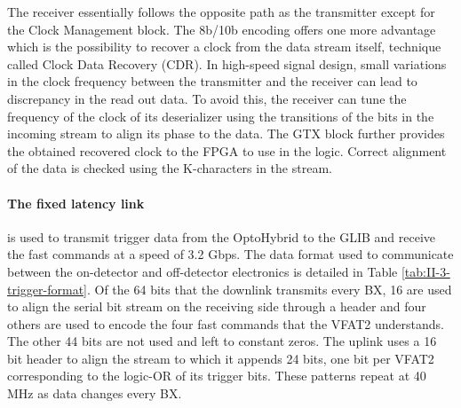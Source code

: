       The receiver essentially follows the opposite path as the transmitter except for the Clock Management block. The 8b/10b encoding offers one more advantage which is the possibility to recover a clock from the data stream itself, technique called Clock Data Recovery (CDR). In high-speed signal design, small variations in the clock frequency between the transmitter and the receiver can lead to discrepancy in the read out data. To avoid this, the receiver can tune the frequency of the clock of its deserializer using the transitions of the bits in the incoming stream to align its phase to the data. The GTX block further provides the obtained recovered clock to the FPGA to use in the logic. Correct alignment of the data is checked using the K-characters in the stream.

      \paragraph{The fixed latency link} is used to transmit trigger data from the OptoHybrid to the GLIB and receive the fast commands at a speed of 3.2 Gbps. The data format used to communicate between the on-detector and off-detector electronics is detailed in Table \ref{tab:II-3-trigger-format}. Of the 64 bits that the downlink transmits every BX, 16 are used to align the serial bit stream on the receiving side through a header and four others are used to encode the four fast commands that the VFAT2 understands. The other 44 bits are not used and left to constant zeros. The uplink uses a 16 bit header to align the stream to which it appends 24 bits, one bit per VFAT2 corresponding to the logic-OR of its trigger bits. These patterns repeat at 40 MHz as data changes every BX.


